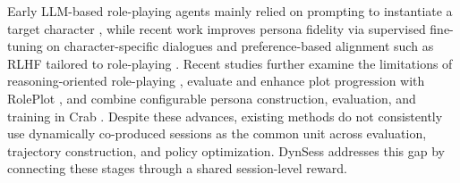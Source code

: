 Early LLM-based role-playing agents mainly relied on prompting to instantiate a target character \cite{characterai}, while recent work improves persona fidelity via supervised fine-tuning on character-specific dialogues \cite{do2025aligning, wang-etal-2024-rolellm, zhou-etal-2024-characterglm, zhu-etal-2025-single} and preference-based alignment such as RLHF tailored to role-playing \cite{ye-etal-2025-cpo, fang2025act}. Recent studies further examine the limitations of reasoning-oriented role-playing \cite{feng-etal-2025-reasoning}, evaluate and enhance plot progression with RolePlot \cite{zhang-etal-2025-roleplot}, and combine configurable persona construction, evaluation, and training in Crab \cite{he-etal-2025-crab}. Despite these advances, existing methods do not consistently use dynamically co-produced sessions as the common unit across evaluation, trajectory construction, and policy optimization. DynSess addresses this gap by connecting these stages through a shared session-level reward.


